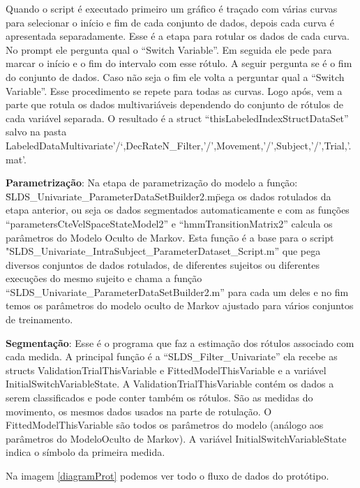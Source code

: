 \begin{itemize}
\begin{sloppypar}
  Quando o script é executado  primeiro um gráfico é traçado com várias curvas 
 para selecionar o início e fim de cada conjunto de dados,
depois cada curva é apresentada separadamente. Esse é a etapa para rotular os 
dados de cada curva. No prompt ele pergunta qual o “Switch Variable”. Em seguida
 ele pede para marcar  o início e o fim do intervalo com esse rótulo. A seguir 
pergunta se é o fim do  conjunto de dados. Caso não seja o fim ele volta a
 perguntar qual a “Switch Variable”. Esse procedimento se repete para todas as curvas.
Logo após, vem a parte que rotula os dados multivariáveis dependendo do conjunto 
de rótulos de cada variável separada. O resultado é a struct “thisLabeledIndexStructDataSet” salvo na pasta 
LabeledDataMultivariate’/‘,DecRateN\_Filter,'/',Movement,'/',Subject,'/',Trial,'.mat'.

\item \textbf{Parametrização}: Na etapa de parametrização do modelo a função:
 \"SLDS\_Univariate\_ParameterDataSetBuilder2.m\" pega os dados rotulados da etapa 
anterior, ou seja os dados segmentados automaticamente e com as funções 
“parametersCteVelSpaceStateModel2” e “hmmTransitionMatrix2” calcula os parâmetros 
do Modelo Oculto de Markov. Esta função é a base para o script 
"SLDS\_Univariate\_IntraSubject\_ParameterDataset\_Script.m”  que pega diversos
 conjuntos de dados rotulados, de diferentes sujeitos ou diferentes execuções 
do mesmo sujeito e chama a função “SLDS\_Univariate\_ParameterDataSetBuilder2.m”
 para cada um deles e no fim temos os parâmetros do modelo oculto de Markov ajustado
 para vários conjuntos de treinamento.  

\end{sloppypar}
\item \textbf{Segmentação}: Esse é o programa que faz a estimação dos rótulos associado com cada medida. 
A principal função é a “SLDS\_Filter\_Univariate” ela recebe as structs 
ValidationTrialThisVariable e FittedModelThisVariable e a variável 
InitialSwitchVariableState. A ValidationTrialThisVariable contém os dados a serem
 classificados e pode conter também os rótulos. São as medidas do movimento, os 
mesmos dados usados na parte de rotulação. O FittedModelThisVariable são todos 
os parâmetros do modelo (análogo aos parâmetros do ModeloOculto de Markov). 
A variável InitialSwitchVariableState indica o símbolo da primeira medida.

Na imagem \ref{diagramProt} podemos ver todo o fluxo de dados do protótipo.
\end{itemize}

